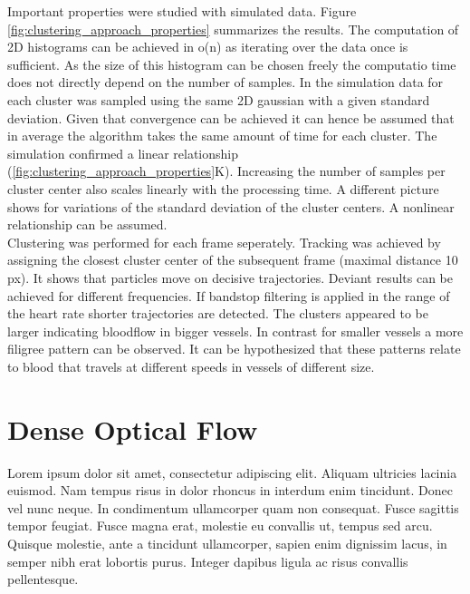 Important properties were studied with simulated data. Figure \ref{fig:clustering_approach_properties} summarizes the results. The computation of 2D histograms can be achieved in o(n) as iterating over the data once is sufficient. As the size of this histogram can be chosen freely the computatio time does not directly depend on the number of samples. In the simulation data for each cluster was sampled using the same 2D gaussian with a given standard deviation. Given that convergence can be achieved it can hence be assumed that in average the algorithm takes the same amount of time for each cluster. The simulation confirmed a linear relationship (\ref{fig:clustering_approach_properties}K). Increasing the number of samples per cluster center also scales linearly with the processing time. A different picture shows for variations of the standard deviation of the cluster centers. A nonlinear relationship can be assumed.\\
Clustering was performed for each frame seperately. Tracking was achieved by assigning the closest cluster center of the subsequent frame (maximal distance 10 px). It shows that particles move on decisive trajectories. Deviant results can be achieved for different frequencies. If bandstop filtering is applied in the range of the heart rate shorter trajectories are detected. The clusters appeared to be larger indicating bloodflow in bigger vessels. In contrast for smaller vessels a more filigree pattern can be observed. It can be hypothesized that these patterns relate to blood that travels at different speeds in vessels of different size.

\section{Dense Optical Flow}

Lorem ipsum dolor sit amet, consectetur adipiscing elit. Aliquam ultricies lacinia euismod. Nam tempus risus in dolor rhoncus in interdum enim tincidunt. Donec vel nunc neque. In condimentum ullamcorper quam non consequat. Fusce sagittis tempor feugiat. Fusce magna erat, molestie eu convallis ut, tempus sed arcu. Quisque molestie, ante a tincidunt ullamcorper, sapien enim dignissim lacus, in semper nibh erat lobortis purus. Integer dapibus ligula ac risus convallis pellentesque.


